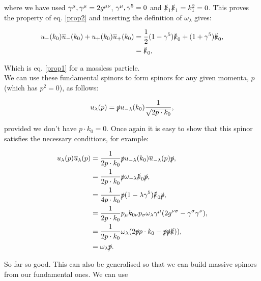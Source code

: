 		where we have used ${\gamma^{\mu}, \gamma^{\mu}}=2g^{\mu\nu}$, ${\gamma^{\mu}, \gamma^{5}}=0$ and $\slashed k_1\slashed k_1=k_1^2=0$.
		This proves the property of eq. \ref{prop2} and inserting the definition of $\omega_\lambda$ gives:

		\begin{subequations}
		\begin{align*}
			u_-(k_0)\overline{u}_-(k_0) + u_+(k_0)\overline{u}_+(k_0) &= \frac{1}{2}(1-\gamma^{5})\slashed k_0 + (1+\gamma^{5})\slashed k_0,\\
			&= \slashed k_0,
		\end{align*}
		\end{subequations}

		Which is eq. \ref{prop1} for a massless particle.\\We can use these fundamental spinors
		to form spinors for any given momenta, $p$ (which has $p^2=0$), as follows:

		\begin{equation}
			u_\lambda(p) = \slashed p u_{-\lambda}(k_0) \frac{1}{\sqrt{2p\cdot k_0}},
		\end{equation}

		provided we don't have $p\cdot k_0=0$.  Once again it is easy to show that this spinor satisfies the necessary conditions, for example:

		\begin{subequations}
		\begin{align*}
			u_\lambda(p)\overline{u}_\lambda(p) &= \frac{1}{2p\cdot k_0}\slashed p u_{-\lambda}(k_0)\overline{u}_{-\lambda}(p)\slashed p,\\
			&= \frac{1}{2p\cdot k_0}\slashed p \omega_{-\lambda}\slashed k_0\slashed p,\\
			&= \frac{1}{4p\cdot k_0}\slashed p (1-\lambda\gamma^{5})\slashed k_0\slashed p,\\
			&= \frac{1}{2p\cdot k_0}p_{\mu}k_{0\nu}p_{\sigma}\omega_{\lambda}\gamma^{\mu}(2g^{\nu\sigma} - \gamma^{\sigma}\gamma^{\nu}),\\
			&= \frac{1}{2p\cdot k_0}\omega_\lambda(2\slashed p p\cdot k_0 - \slashed p\slashed p\slashed k)),\\
			&= \omega_\lambda\slashed p.\\
		\end{align*}
		\end{subequations}

		So far so good.  This can also be generalised so that we can build massive spinors from our fundamental ones.  We can use

